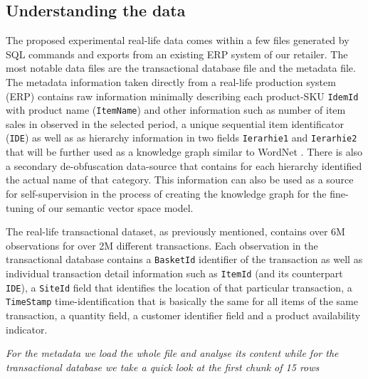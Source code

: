 \documentclass[11pt]{article}
\begin{document}
    \hypertarget{understanding-the-data}{%
\subsection{Understanding the data}\label{understanding-the-data}}

The proposed experimental real-life data comes within a few files
generated by SQL commands and exports from an existing ERP system of our
retailer. The most notable data files are the transactional database
file and the metadata file. The metadata information taken directly from
a real-life production system (ERP) contains raw information minimally
describing each product-SKU \texttt{IdemId} with product name
(\texttt{ItemName}) and other information such as number of item sales
in observed in the selected period, a unique sequential item
identificator (\texttt{IDE}) as well as as hierarchy information in two
fields \texttt{Ierarhie1} and \texttt{Ierarhie2} that will be further
used as a knowledge graph similar to WordNet \cite{miller1995wordnet}.
There is also a secondary de-obfuscation data-source that contains for
each hierarchy identified the actual name of that category. This
information can also be used as a source for self-supervision in the
process of creating the knowledge graph for the fine-tuning of our
semantic vector space model.

The real-life transactional dataset, as previously mentioned, contains
over 6M observations for over 2M different transactions. Each
observation in the transactional database contains a \texttt{BasketId}
identifier of the transaction as well as individual transaction detail
information such as \texttt{ItemId} (and its counterpart \texttt{IDE}),
a \texttt{SiteId} field that identifies the location of that particular
transaction, a \texttt{TimeStamp} time-identification that is basically
the same for all items of the same transaction, a quantity field, a
customer identifier field and a product availability indicator.

\emph{For the metadata we load the whole file and analyse its content
while for the transactional database we take a quick look at the first
chunk of 15 rows}
\end{document}
